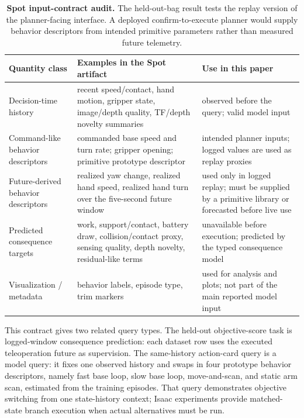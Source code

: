 \begin{table}[H]
\centering
\scriptsize
\caption{\textbf{Spot input-contract audit.}
The held-out-bag result tests the replay version of the planner-facing interface. A deployed confirm-to-execute planner would supply behavior descriptors from intended primitive parameters rather than measured future telemetry.}
\label{tab:spot-input-contract-arxiv}
\setlength{\tabcolsep}{3pt}
\begin{tabularx}{\linewidth}{@{}lXX@{}}
\toprule
\textbf{Quantity class} & \textbf{Examples in the Spot artifact} & \textbf{Use in this paper} \\
\midrule
Decision-time history & recent speed/contact, hand motion, gripper state, image/depth quality, TF/depth novelty summaries & observed before the query; valid model input \\
Command-like behavior descriptors & commanded base speed and turn rate; gripper opening; primitive prototype descriptor & intended planner inputs; logged values are used as replay proxies \\
Future-derived behavior descriptors & realized yaw change, realized hand speed, realized hand turn over the five-second future window & used only in logged replay; must be supplied by a primitive library or forecasted before live use \\
Predicted consequence targets & work, support/contact, battery draw, collision/contact proxy, sensing quality, depth novelty, residual-like terms & unavailable before execution; predicted by the typed consequence model \\
Visualization / metadata & behavior labels, episode type, trim markers & used for analysis and plots; not part of the main reported model input \\
\bottomrule
\end{tabularx}
\end{table}

This contract gives two related query types.
The held-out objective-score task is logged-window consequence prediction: each dataset row uses the executed teleoperation future as supervision.
The same-history action-card query is a model query: it fixes one observed history and swaps in four prototype behavior descriptors, namely fast base loop, slow base loop, move-and-scan, and static arm scan, estimated from the training episodes.
That query demonstrates objective switching from one state-history context; Isaac experiments provide matched-state branch execution when actual alternatives must be run.

